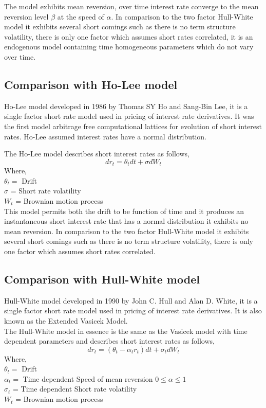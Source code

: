 \documentclass{article}
\begin{document}
The model exhibits mean reversion, over time interest rate converge to the mean reversion level $\beta$ at the speed of $\alpha$.  In comparison to the two factor Hull-White model it exhibits several short comings such as there is no term structure volatility, there is only one factor which assumes short rates correlated, it is an endogenous model containing time homogeneous parameters which do not vary over time.

\subsection{Comparison with Ho-Lee model
}
Ho-Lee model developed in 1986 \cite{HoLee1} by Thomas SY Ho and Sang-Bin Lee, it is a single factor short rate model used in pricing of interest rate derivatives.  It was the first model arbitrage free computational lattices for evolution of short interest rates.  Ho-Lee assumed interest rates have a normal distribution.

The Ho-Lee  model describes short interest rates as follows,
 \[
dr_t = \theta_t dt + \sigma  dW_t
\]
Where,\\
$\theta_t =$ Drift  \\
$\sigma$ = Short rate volatility \\
$W_t$ = Brownian motion process  \\

This model permits both the drift to be function of time and it produces an instantaneous short interest rate that has a normal distribution it exhibits no mean reversion.  In comparison to the two factor Hull-White model it exhibits several short comings such as there is no term structure volatility, there is only one factor which assumes short rates correlated.

\subsection{Comparison with Hull-White model
}
Hull-White model developed in 1990 \cite{HW1} by John C. Hull and Alan D. White, it is a single factor short rate model used in pricing of interest rate derivatives.  It is also known as the Extended Vasicek Model.\\

The Hull-White model in essence is the same as the Vasicek model with time dependent parameters and describes short interest rates as follows,
 \[
dr_t = (\theta_t - \alpha_t r_t) dt + \sigma_t  dW_t
\]
Where,\\
$\theta_t =$ Drift  \\
$\alpha_t =$ Time dependent Speed of mean reversion $0 \leq \alpha \leq 1 $ \\
$\sigma_t$ = Time dependent Short rate volatility \\
$W_t$ = Brownian motion process  \\
\end{document}
